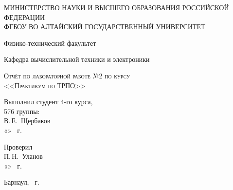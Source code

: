 \documentclass[a4paper,14pt]{extarticle}
\begin{document}
\begin{titlepage}
  \begin{center}
    \MakeUppercase{Министерство науки и высшего образования Российской Федерации} \\
    \MakeUppercase{ФГБОУ ВО Алтайский государственный университет}
    \vspace{0.25cm}
    
    Физико-технический факультет
    
    Кафедра вычислительной техники и электроники
    \vfill
    
    \textsc{Отчёт по лабораторной работе №2 по курсу \\ <<Практикум по ТРПО>>}
  \bigskip

\end{center}
\vfill

\newlength{\ML}
\hfill\begin{minipage}{0.5\textwidth}
  Выполнил студент 4-го курса, \\ 576 группы:\\
  \underline{\hspace{\ML}} В.\,Е.~Щербаков\\
  «\underline{\hspace{0.7cm}}» \underline{\hspace{2cm}} \the\year~г.
\end{minipage}%
\bigskip

\hfill\begin{minipage}{0.5\textwidth}
  Проверил\\
  \underline{\hspace{\ML}} П.\,Н.~Уланов\\
  «\underline{\hspace{0.7cm}}» \underline{\hspace{2cm}} \the\year~г.
\end{minipage}%
\vfill

\begin{center}
  Барнаул, \the\year~г.
\end{center}
\end{titlepage}

\tableofcontents

\newpage
\end{document}
